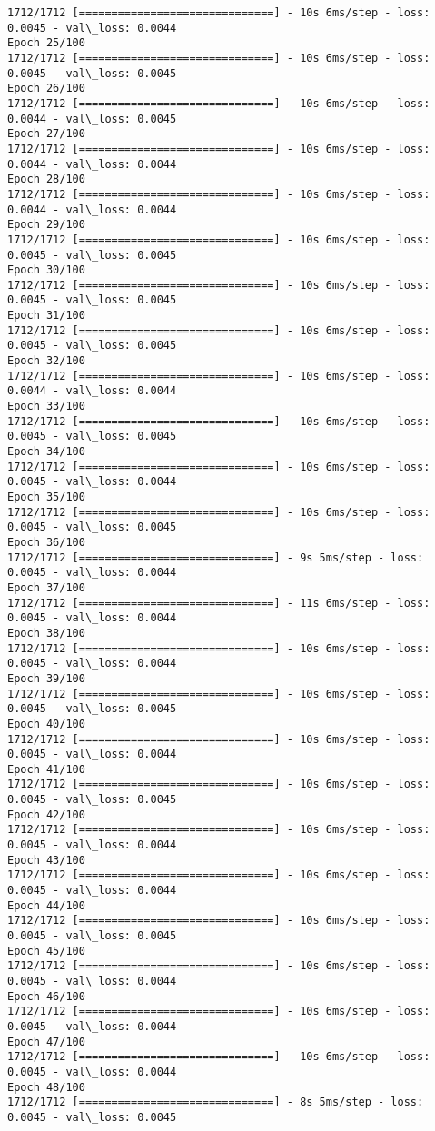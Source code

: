 \documentclass[11pt]{article}
\begin{document}
\begin{Verbatim}[commandchars=\\\{\}]
1712/1712 [==============================] - 10s 6ms/step - loss: 0.0045 - val\_loss: 0.0044
Epoch 25/100
1712/1712 [==============================] - 10s 6ms/step - loss: 0.0045 - val\_loss: 0.0045
Epoch 26/100
1712/1712 [==============================] - 10s 6ms/step - loss: 0.0044 - val\_loss: 0.0045
Epoch 27/100
1712/1712 [==============================] - 10s 6ms/step - loss: 0.0044 - val\_loss: 0.0044
Epoch 28/100
1712/1712 [==============================] - 10s 6ms/step - loss: 0.0044 - val\_loss: 0.0044
Epoch 29/100
1712/1712 [==============================] - 10s 6ms/step - loss: 0.0045 - val\_loss: 0.0045
Epoch 30/100
1712/1712 [==============================] - 10s 6ms/step - loss: 0.0045 - val\_loss: 0.0045
Epoch 31/100
1712/1712 [==============================] - 10s 6ms/step - loss: 0.0045 - val\_loss: 0.0045
Epoch 32/100
1712/1712 [==============================] - 10s 6ms/step - loss: 0.0044 - val\_loss: 0.0044
Epoch 33/100
1712/1712 [==============================] - 10s 6ms/step - loss: 0.0045 - val\_loss: 0.0045
Epoch 34/100
1712/1712 [==============================] - 10s 6ms/step - loss: 0.0045 - val\_loss: 0.0044
Epoch 35/100
1712/1712 [==============================] - 10s 6ms/step - loss: 0.0045 - val\_loss: 0.0045
Epoch 36/100
1712/1712 [==============================] - 9s 5ms/step - loss: 0.0045 - val\_loss: 0.0044
Epoch 37/100
1712/1712 [==============================] - 11s 6ms/step - loss: 0.0045 - val\_loss: 0.0044
Epoch 38/100
1712/1712 [==============================] - 10s 6ms/step - loss: 0.0045 - val\_loss: 0.0044
Epoch 39/100
1712/1712 [==============================] - 10s 6ms/step - loss: 0.0045 - val\_loss: 0.0045
Epoch 40/100
1712/1712 [==============================] - 10s 6ms/step - loss: 0.0045 - val\_loss: 0.0044
Epoch 41/100
1712/1712 [==============================] - 10s 6ms/step - loss: 0.0045 - val\_loss: 0.0045
Epoch 42/100
1712/1712 [==============================] - 10s 6ms/step - loss: 0.0045 - val\_loss: 0.0044
Epoch 43/100
1712/1712 [==============================] - 10s 6ms/step - loss: 0.0045 - val\_loss: 0.0044
Epoch 44/100
1712/1712 [==============================] - 10s 6ms/step - loss: 0.0045 - val\_loss: 0.0045
Epoch 45/100
1712/1712 [==============================] - 10s 6ms/step - loss: 0.0045 - val\_loss: 0.0044
Epoch 46/100
1712/1712 [==============================] - 10s 6ms/step - loss: 0.0045 - val\_loss: 0.0044
Epoch 47/100
1712/1712 [==============================] - 10s 6ms/step - loss: 0.0045 - val\_loss: 0.0044
Epoch 48/100
1712/1712 [==============================] - 8s 5ms/step - loss: 0.0045 - val\_loss: 0.0045

\end{Verbatim}
\end{document}
